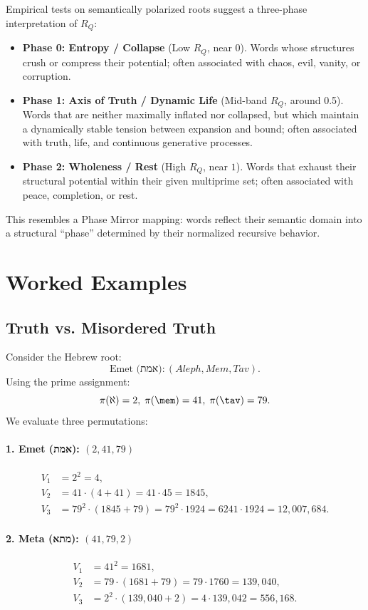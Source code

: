 \documentclass[11pt]{article}
\begin{document}
Empirical tests on semantically polarized roots suggest a three-phase interpretation of $R_Q$:
\begin{itemize}
    \item \textbf{Phase 0: Entropy / Collapse} (Low $R_Q$, near $0$). Words whose structures crush or compress their potential; often associated with chaos, evil, vanity, or corruption.
    \item \textbf{Phase 1: Axis of Truth / Dynamic Life} (Mid-band $R_Q$, around 0.5). Words that are neither maximally inflated nor collapsed, but which maintain a dynamically stable tension between expansion and bound; often associated with truth, life, and continuous generative processes.
    \item \textbf{Phase 2: Wholeness / Rest} (High $R_Q$, near $1$). Words that exhaust their structural potential within their given multiprime set; often associated with peace, completion, or rest.
\end{itemize}

This resembles a Phase Mirror mapping: words reflect their semantic domain into a structural ``phase'' determined by their normalized recursive behavior.

\section{Worked Examples}

\subsection{Truth vs. Misordered Truth}

Consider the Hebrew root:
\[
\text{Emet (אמת)}: (Aleph, Mem, Tav).
\]
Using the prime assignment:
\[
\pi(\aleph) = 2,\;\pi(\mem) = 41,\;\pi(\tav) = 79.
\]
We evaluate three permutations:

\paragraph{1. Emet (אמת): $(2,41,79)$}
\begin{align*}
V_1 &= 2^2 = 4,\\
V_2 &= 41 \cdot (4 + 41) = 41 \cdot 45 = 1845,\\
V_3 &= 79^2 \cdot (1845 + 79) = 79^2 \cdot 1924 = 6241 \cdot 1924 = 12{,}007{,}684.
\end{align*}

\paragraph{2. Meta (מתא): $(41,79,2)$}
\begin{align*}
V_1 &= 41^2 = 1681,\\
V_2 &= 79 \cdot (1681 + 79) = 79 \cdot 1760 = 139{,}040,\\
V_3 &= 2^2 \cdot (139{,}040 + 2) = 4 \cdot 139{,}042 = 556{,}168.
\end{align*}
\end{document}
